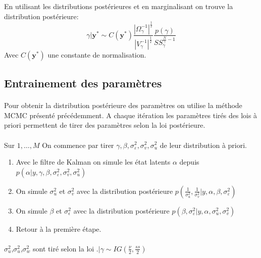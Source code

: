 \documentclass{article}
\theoremstyle{definition}
\theoremstyle{remark}
\begin{document}
{En utilisant les distributions postérieures et en marginalisant on trouve la distribution postérieure:
\begin{equation}
	\gamma | \mathbf{y}^{*} \sim C\left(\mathbf{y}^{*}\right) \frac{\left|\Omega_{\gamma}^{-1}\right|^{\frac{1}{2}}}{\left|V_{\gamma}^{-1}\right|^{\frac{1}{2}}} \frac{p(\gamma)}{S S_{\gamma}^{\frac{N}{\gamma}-1}}
	\end{equation}
Avec $ C\left(\mathbf{y}^{*}\right)$ une constante de normalisation.

\subsection{Entrainement des paramètres}
\paragraph{}
Pour obtenir la distribution postérieure des paramètres on utilise la méthode MCMC présenté précédemment.
A chaque itération les paramètres tirés des lois à priori permettent de tirer des paramètres selon la loi postérieure.
\paragraph{}
Sur $1, \ldots, M$
On commence par tirer $\gamma, \beta, \sigma_{\varepsilon}^{2}, \sigma_{v}^{2}, \sigma_{u}^{2}$ de leur distribution à priori.
\begin{enumerate}
\item Avec le filtre de Kalman on simule les état latents $\alpha$ depuis $p\left(\alpha | y, \gamma, \beta, \sigma_{\varepsilon}^{2}, \sigma_{v}^{2}, \sigma_{u}^{2}\right)$
\item On simule $\sigma_u^2$ et $\sigma_v^2$ avec la distribution postérieure $p\left(\frac{1}{\sigma_{u}^{2}}, \frac{1}{\sigma_{v}^{2}} | y, \alpha, \beta, \sigma_{\varepsilon}^{2}\right)$
\item On simule $\beta$ et $\sigma_\epsilon^2$ avec la distribution postérieure $p\left(\beta, \sigma_{\varepsilon}^{2} | y, \alpha, \sigma_{u}^{2}, \sigma_{v}^{2}\right)$
\item Retour à la première étape.
\end{enumerate}
\paragraph{}
$\sigma_u^2$,$\sigma_u^2$,$\sigma_w^2$ sont tiré selon la loi $. | \gamma \sim I G\left(\frac{\nu}{2}, \frac{s s}{2}\right)
$
}
\end{document}
